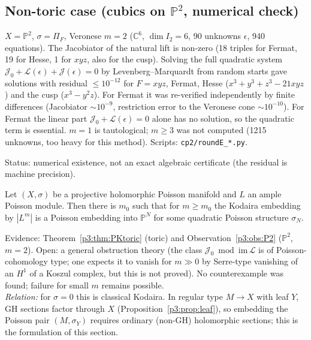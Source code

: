 \subsection{Non-toric case (cubics on $\mathbb P^2$, numerical check)}
\begin{obs}\tV\label{p3:obs:P2}
$X=\mathbb P^2$, $\sigma=\Pi_F$, Veronese $m=2$ ($\mathbb C^6$, $\dim I_2=6$, 90 unknowns $\epsilon$, 940 equations). The Jacobiator of the natural lift is non-zero (18 triples for Fermat, 19 for Hesse, 1 for $xyz$, also for the cusp). Solving the full quadratic system $\mathcal J_0+\mathcal L(\epsilon)+\mathcal J(\epsilon)=0$ by Levenberg--Marquardt from random starts gave solutions with residual $\le10^{-12}$ for $F=xyz$, Fermat, Hesse ($x^3+y^3+z^3-21xyz$) and the cusp ($x^3-y^2z$). For Fermat it was re-verified independently by finite differences (Jacobiator $\sim10^{-9}$, restriction error to the Veronese cone $\sim10^{-10}$). For Fermat the linear part $\mathcal J_0+\mathcal L(\epsilon)=0$ alone has no solution, so the quadratic term is essential. $m=1$ is tautological; $m\ge3$ was not computed (1215 unknowns, too heavy for this method). Scripts: \texttt{cp2/roundE\_*.py}.
\end{obs}
\noindent Status: numerical existence, not an exact algebraic certificate (the residual is machine precision).

\begin{conj}\tK\label{p3:conj:PK}
Let $(X,\sigma)$ be a projective holomorphic Poisson manifold and $L$ an ample Poisson module. Then there is $m_0$ such that for $m\ge m_0$ the Kodaira embedding by $|L^m|$ is a Poisson embedding into $\mathbb P^N$ for some quadratic Poisson structure $\sigma_N$.
\end{conj}
\noindent Evidence: Theorem~\ref{p3:thm:PKtoric} (toric) and Observation~\ref{p3:obs:P2} ($\mathbb P^2$, $m=2$). Open: a general obstruction theory (the class $\mathcal J_0\bmod\mathrm{im}\,\mathcal L$ is of Poisson-cohomology type; one expects it to vanish for $m\gg0$ by Serre-type vanishing of an $H^1$ of a Koszul complex, but this is not proved). No counterexample was found; failure for small $m$ remains possible.\\
\emph{Relation:} for $\sigma=0$ this is classical Kodaira. In regular type $M\to X$ with leaf $Y$, GH sections factor through $X$ (Proposition~\ref{p3:prop:leaf}), so embedding the Poisson pair $(M,\sigma_Y)$ requires ordinary (non-GH) holomorphic sections; this is the formulation of this section.

